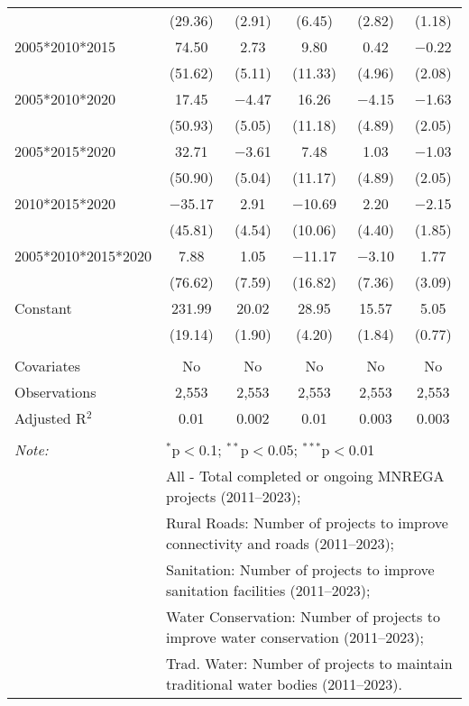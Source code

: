 \begin{table}[!htbp]
\begin{tabular}{@{\extracolsep{5pt}}lccccc}
  & (29.36) & (2.91) & (6.45) & (2.82) & (1.18) \\ 
  2005*2010*2015 & 74.50 & 2.73 & 9.80 & 0.42 & $-$0.22 \\ 
  & (51.62) & (5.11) & (11.33) & (4.96) & (2.08) \\ 
  2005*2010*2020 & 17.45 & $-$4.47 & 16.26 & $-$4.15 & $-$1.63 \\ 
  & (50.93) & (5.05) & (11.18) & (4.89) & (2.05) \\ 
  2005*2015*2020 & 32.71 & $-$3.61 & 7.48 & 1.03 & $-$1.03 \\ 
  & (50.90) & (5.04) & (11.17) & (4.89) & (2.05) \\ 
  2010*2015*2020 & $-$35.17 & 2.91 & $-$10.69 & 2.20 & $-$2.15 \\ 
  & (45.81) & (4.54) & (10.06) & (4.40) & (1.85) \\ 
  2005*2010*2015*2020 & 7.88 & 1.05 & $-$11.17 & $-$3.10 & 1.77 \\ 
  & (76.62) & (7.59) & (16.82) & (7.36) & (3.09) \\ 
  Constant & 231.99 & 20.02 & 28.95 & 15.57 & 5.05 \\ 
  & (19.14) & (1.90) & (4.20) & (1.84) & (0.77) \\ 
 \hline \\[-1.8ex] 
Covariates & No & No & No & No & No \\ 
Observations & 2,553 & 2,553 & 2,553 & 2,553 & 2,553 \\ 
Adjusted R$^{2}$ & 0.01 & 0.002 & 0.01 & 0.003 & 0.003 \\ 
\hline 
\hline \\[-1.8ex] 
\textit{Note:}  & \multicolumn{5}{l}{$^{*}$p$<$0.1; $^{**}$p$<$0.05; $^{***}$p$<$0.01} \\ 
 & \multicolumn{5}{l}{All - Total completed or ongoing MNREGA projects (2011--2023);} \\ 
 & \multicolumn{5}{l}{Rural Roads: Number of projects to improve connectivity and roads (2011--2023);} \\ 
 & \multicolumn{5}{l}{Sanitation:  Number of projects to improve sanitation facilities  (2011--2023);} \\ 
 & \multicolumn{5}{l}{Water Conservation: Number of projects to improve water conservation (2011--2023);} \\ 
 & \multicolumn{5}{l}{Trad. Water: Number of projects to maintain traditional water bodies (2011--2023).} \\ 
\end{tabular} 
\end{table} 
